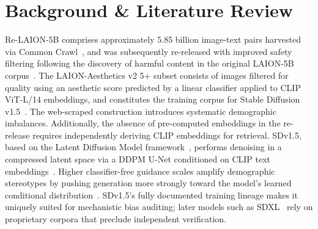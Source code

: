 \section{Background \& Literature Review}

Re-LAION-5B comprises approximately 5.85 billion image-text pairs harvested via Common
Crawl~\cite{Schuhmann_2022_Laion5b}, and was subsequently re-released with improved safety
filtering following the discovery of harmful content in the original LAION-5B
corpus~\cite{Laion_2024_Relaion5B}. The LAION-Aesthetics v2 5+ subset consists of
images filtered for quality using an aesthetic score predicted by a linear classifier
applied to CLIP ViT-L/14 embeddings, and constitutes the training corpus for Stable
Diffusion v1.5~\cite{Schuhmann_2022_LaionAesthetics}. The web-scraped construction
introduces systematic demographic imbalances. Additionally, the absence of pre-computed
embeddings in the re-release requires independently deriving CLIP embeddings for
retrieval. SDv1.5, based on the Latent Diffusion Model framework~\cite{Rombach_2022_CVPR},
performs denoising in a compressed latent space via a DDPM U-Net conditioned on CLIP
text embeddings~\cite{Ho_2020_DDPM, Radford_2021_CLIP}. Higher classifier-free guidance
scales amplify demographic stereotypes by pushing generation more strongly toward the
model's learned conditional distribution~\cite{Ho_2022_CFG}. SDv1.5's fully documented
training lineage makes it uniquely suited for mechanistic bias auditing; later models
such as SDXL~\cite{Podell_2023_SDXL} rely on proprietary corpora that preclude
independent verification.

